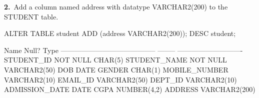 
\noindent\begin{minipage}{\linewidth}
\begingroup{}
{\fontsize{14}{17}\selectfont\textbf{2.}}\ Add a column named address with datatype VARCHAR2(200) to the STUDENT table.\par
\endgroup\vspace{12pt}


\begin{sqlcode}
ALTER TABLE student ADD (address VARCHAR2(200));
DESC student;
\end{sqlcode}

\vspace{18pt}


\begin{sqlout}
 Name                                      Null?    Type
 ----------------------------------------- -------- ----------------------------
 STUDENT_ID                                NOT NULL CHAR(5)
 STUDENT_NAME                              NOT NULL VARCHAR2(50)
 DOB                                                DATE
 GENDER                                             CHAR(1)
 MOBILE_NUMBER                                      VARCHAR2(10)
 EMAIL_ID                                           VARCHAR2(50)
 DEPT_ID                                            VARCHAR2(10)
 ADMISSION_DATE                                     DATE
 CGPA                                               NUMBER(4,2)
 ADDRESS                                            VARCHAR2(200)
\end{sqlout}
\end{minipage}\par\vspace{30pt}


